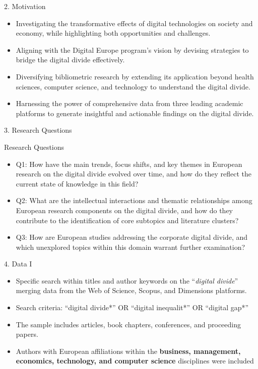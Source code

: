 \documentclass[
  ignorenonframetext,
]{beamer}
\providecommand{\tightlist}{%
  \setlength{\itemsep}{0pt}\setlength{\parskip}{0pt}}
\begin{document}
\begin{frame}{2. Motivation}
\protect\hypertarget{motivation}{}
\begin{itemize}
\item
  Investigating the transformative effects of digital technologies on
  society and economy, while highlighting both opportunities and
  challenges.
\item
  Aligning with the Digital Europe program's vision by devising
  strategies to bridge the digital divide effectively.
\item
  Diversifying bibliometric research by extending its application beyond
  health sciences, computer science, and technology to understand the
  digital divide.
\item
  Harnessing the power of comprehensive data from three leading academic
  platforms to generate insightful and actionable findings on the
  digital divide.
\end{itemize}
\end{frame}

\begin{frame}{3. Research Questions}
\protect\hypertarget{research-questions}{}
\begin{block}{Research Questions}
\protect\hypertarget{research-questions-1}{}
\begin{itemize}
\item
  Q1: How have the main trends, focus shifts, and key themes in European
  research on the digital divide evolved over time, and how do they
  reflect the current state of knowledge in this field?
\item
  Q2: What are the intellectual interactions and thematic relationships
  among European research components on the digital divide, and how do
  they contribute to the identification of core subtopics and literature
  clusters?
\item
  Q3: How are European studies addressing the corporate digital divide,
  and which unexplored topics within this domain warrant further
  examination?
\end{itemize}
\end{block}
\end{frame}

\begin{frame}{4. Data I}
\protect\hypertarget{data-i}{}
\begin{itemize}
\tightlist
\item
  Specific search within titles and author keywords on the
  ``\emph{digital divide}'' merging data from the Web of Science,
  Scopus, and Dimensions platforms.
\item
  Search criteria: ``digital divide*'' OR ``digital inequalit*'' OR
  ``digital gap*''
\item
  The sample includes articles, book chapters, conferences, and
  proceeding papers.
\item
  Authors with European affiliations within the \textbf{business,
  management, economics, technology, and computer science} disciplines
  were included
\end{itemize}
\end{frame}
\end{document}
